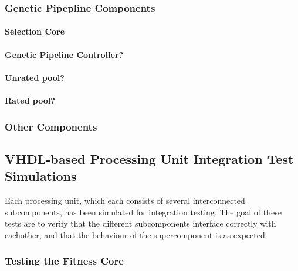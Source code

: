 \subsubsection{Genetic Pipepline Components}
\paragraph{Selection Core}
\paragraph{Genetic Pipeline Controller?}
\paragraph{Unrated pool?}
\paragraph{Rated pool?}








\subsubsection{Other Components}

\subsection{\gls{VHDL}-based Processing Unit Integration Test Simulations}

Each processing unit, which each consists of several interconnected subcomponents, has been simulated for integration testing.
The goal of these tests are to verify that the different subcomponents interface correctly with eachother, and that the behaviour of the supercomponent is as expected.

\subsubsection{Testing the Fitness Core}


